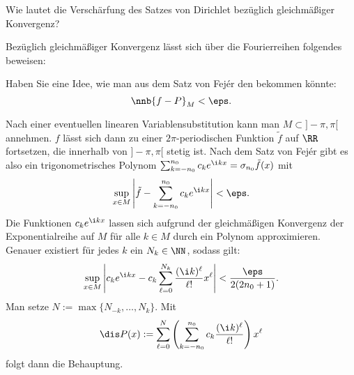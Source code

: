   \begin{frage}
    Wie lautet die Verschärfung des Satzes von Dirichlet bezüglich 
    gleichmäßiger Konvergenz?
  \end{frage}

  \begin{antwort}
    Bezüglich gleichmäßiger Konvergenz lässt sich 
    über die Fourierreihen folgendes beweisen:

    \medskip
    \noindent{}
  \end{antwort}

  \begin{frage}
    Haben Sie eine Idee, wie man aus dem Satz von Fej\'er den 
     bekommen könnte: 
    \[
    \nnb{ f - P }_M  < \eps .
    \]
  \end{frage} 

  \begin{antwort}
    Nach einer eventuellen linearen Variablensubstitution kann 
    man $M\subset ]-\pi,\pi[$ annehmen. 
    $f$ lässt sich dann zu einer $2\pi$-periodischen Funktion $\tilde{f}$ 
    auf $\RR$ fortsetzen, die innerhalb von $ ]-\pi,\pi[$ stetig 
    ist. Nach dem Satz von Fej\'er gibt es also ein trigonometrisches Polynom 
    $\sum_{k=-{n_0}}^{n_0} c_k e^{\i kx}=\sigma_{n_0} \tilde{f}(x)$ mit 
    \[
    \sup_{x\in M}\left| \tilde{f}-\sum_{k=-{n_0}}^{n_0} 
      c_k e^{\i kx} \right|< \eps.
    \]
    Die Funktionen $c_k e^{\i kx}$ lassen sich aufgrund der gleichmäßigen 
    Konvergenz der Exponentialreihe auf $M$ für alle $k\in M$ 
    durch ein Polynom approximieren. Genauer existiert für jedes 
    $k$ ein $N_k \in \NN$, sodass gilt: 
    \[
    \sup_{x\in M} 
    \left| c_k e^{\i kx} - c_k \sum_{\ell=0}^{N_k} \frac{(\i k)^\ell}{\ell!} 
      x^\ell  \right| 
    < \frac{\eps}{2(2{n_0}+1)}. 
    \]
    Man setze $N:=\max\{ N_{-k}, \ldots, N_k \}$. Mit  
    \[
    \dis P(x): = \sum_{\ell=0}^{N} 
    \left( \sum_{k=-{n_0}}^{n_0} c_k \frac{(\i k)^\ell}{\ell!} \right) x^\ell
    \]
    folgt dann die Behauptung. \AntEnd
  \end{antwort}




